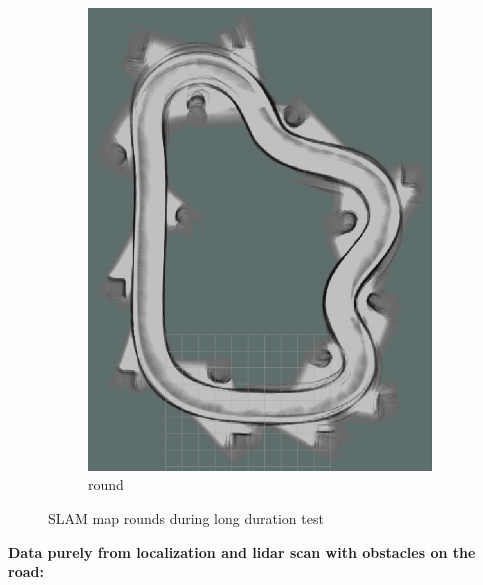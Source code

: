 \begin{figure}[H]
\begin{subfigure}{.3\linewidth}
		\includegraphics[width=\textwidth]{Pictures/2slamtest7}
		\caption{ round}
	\end{subfigure}

	\caption{SLAM map rounds during long duration test}
	\label{3slamtest}

\end{figure}


\textbf{Data purely from localization and lidar scan with obstacles on the road:}\\


